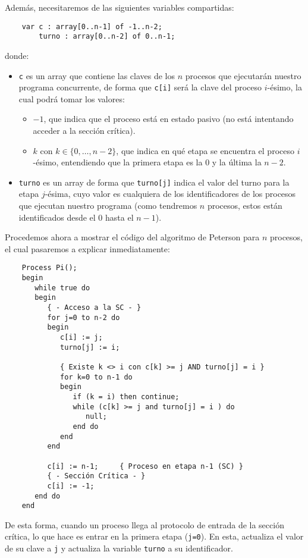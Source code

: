 Además, necesitaremos de las siguientes variables compartidas:
\begin{verbatim}
    var c : array[0..n-1] of -1..n-2;
        turno : array[0..n-2] of 0..n-1;
\end{verbatim}
donde:
\begin{itemize}
    \item \verb|c| es un array que contiene las claves de los $n$ procesos que ejecutarán nuestro programa concurrente, de forma que \verb|c[i]| será la clave del proceso $i$-ésimo, la cual podrá tomar los valores:
        \begin{itemize}
            \item $-1$, que indica que el proceso está en estado pasivo (no está intentando acceder a la sección crítica).
            \item $k$ con $k \in \{0,\ldots,n-2\}$, que indica en qué etapa se encuentra el proceso $i$-ésimo, entendiendo que la primera etapa es la $0$ y la última la $n-2$.
        \end{itemize}
    \item \verb|turno| es un array de forma que \verb|turno[j]| indica el valor del turno para la etapa $j$-ésima, cuyo valor es cualquiera de los identificadores de los procesos que ejecutan nuestro programa (como tendremos $n$ procesos, estos están identificados desde el $0$ hasta el $n-1$).
\end{itemize}
Procedemos ahora a mostrar el código del algoritmo de Peterson para $n$ procesos, el cual pasaremos a explicar inmediatamente:
\begin{verbatim}
    Process Pi();
    begin
       while true do
       begin
          { - Acceso a la SC - }
          for j=0 to n-2 do
          begin
             c[i] := j;
             turno[j] := i;

             { Existe k <> i con c[k] >= j AND turno[j] = i }
             for k=0 to n-1 do
             begin
                if (k = i) then continue;
                while (c[k] >= j and turno[j] = i ) do
                   null;
                end do
             end
          end

          c[i] := n-1;     { Proceso en etapa n-1 (SC) }
          { - Sección Crítica - }
          c[i] := -1;
       end do
    end
\end{verbatim}
De esta forma, cuando un proceso llega al protocolo de entrada de la sección crítica, lo que hace es entrar en la primera etapa (\verb|j=0|). En esta, actualiza el valor de su clave a \verb|j| y actualiza la variable \verb|turno| a su identificador.

